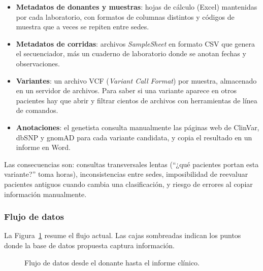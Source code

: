\documentclass[11pt,a4paper]{article}
\begin{document}
\begin{itemize}
  \item \textbf{Metadatos de donantes y muestras}: hojas de cálculo (Excel) mantenidas por cada laboratorio, con formatos de columnas distintos y códigos de muestra que a veces se repiten entre sedes.
  \item \textbf{Metadatos de corridas}: archivos \emph{SampleSheet} en formato CSV que genera el secuenciador, más un cuaderno de laboratorio donde se anotan fechas y observaciones.
  \item \textbf{Variantes}: un archivo VCF (\emph{Variant Call Format}) por muestra, almacenado en un servidor de archivos. Para saber si una variante aparece en otros pacientes hay que abrir y filtrar cientos de archivos con herramientas de línea de comandos.
  \item \textbf{Anotaciones}: el genetista consulta manualmente las páginas web de ClinVar, dbSNP y gnomAD para cada variante candidata, y copia el resultado en un informe en Word.
\end{itemize}

Las consecuencias son: consultas transversales lentas (``¿qué pacientes portan esta variante?'' toma horas), inconsistencias entre sedes, imposibilidad de reevaluar pacientes antiguos cuando cambia una clasificación, y riesgo de errores al copiar información manualmente.

\subsubsection{Flujo de datos}

La Figura~\ref{fig:flujo} resume el flujo actual. Las cajas sombreadas indican los puntos donde la base de datos propuesta captura información.

\begin{figure}[H]
\centering
{}
\caption{Flujo de datos desde el donante hasta el informe clínico.}
\label{fig:flujo}
\end{figure}
\end{document}
